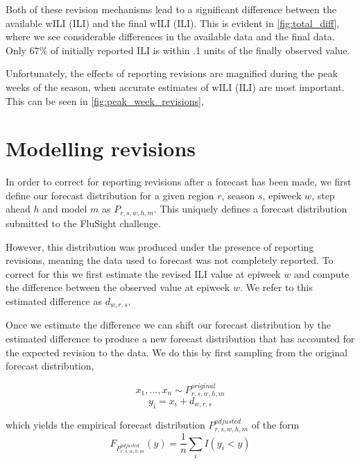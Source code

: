 \documentclass{umassthesis}          %
\begin{document}
Both of these revision mechanisms lead to a significant difference between the available wILI (ILI) and the final wILI (ILI). This is evident in \ref{fig:total_diff}, where we see considerable differences in the available data and the final data. Only $67\%$ of initially reported ILI is within .1 units of the finally observed value.  


Unfortunately, the effects of reporting revisions are magnified during the peak weeks of the season, when accurate estimates of wILI (ILI) are most important. This can be seen in 
\ref{fig:peak_week_revisions}, 




\section{Modelling revisions}

In order to correct for reporting revisions after a forecast has been made, we first define our forecast distribution for a given region $r$, season $s$, epiweek $w$, step ahead $h$ and model $m$ as $P_{r,s,w,h,m}$. This uniquely defines a forecast distribution submitted to the FluSight challenge. 

However, this distribution was produced under the presence of reporting revisions, meaning the data used to forecast was not completely reported. To correct for this we first estimate the revised ILI value at epiweek $w$ and compute the difference between the observed value at epiweek $w$. We refer to this estimated difference as $d_{w,r,s}$. 

Once we estimate the difference we can shift our forecast distribution by the estimated difference to produce a new forecast distribution that has accounted for the expected revision to the data. We do this by first sampling from the original forecast distribution, 



\begin{equation}
   x_1,...,x_n \sim P_{r,s,w,h,m}^{original} 
\end{equation}
\begin{equation}
   y_i = x_i + d_{w,r,s}
\end{equation}


which yields the empirical forecast distribution $P_{r,s,w,h,m}^{adjusted}$ of the form
\begin{equation}
  F_{P_{r,s,w,h,m}^{adjusted}}(y) =\frac{1}{n}\sum_i I(y_i < y) 
\end{equation}
\end{document}
